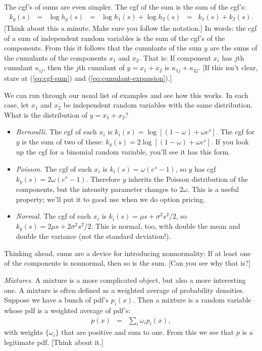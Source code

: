 \documentclass[11pt]{article}
\begin{document}
The cgf's of sums are even simpler.
The cgf of the sum is the sum of the cgf's:
\begin{eqnarray}
    k_y(s) &=& \log h_y(s)
            \;\;=\;\; \log h_1(s) + \log h_2(s)
            \;\;=\;\; k_1(s) + k_2(s) .
            \label{eq:cgf-sum}
\end{eqnarray}
[Think about this a minute.  Make sure you follow the notation.]
In words: the cgf of a sum of independent random variables
is the sum of the cgf's of the components.
From this it follows that the cumulants of the sum $y$
are the sums of the cumulants of the components $x_1$ and $x_2$.
That is:  If component $x_i$ has $j$th cumulant  $\kappa_{ij}$,
then the $j$th cumulant of $y = x_1 + x_2$ is $ \kappa_{1j} + \kappa_{2j}$.
[If this isn't clear, stare at (\ref{eq:cgf-sum}) and (\ref{eq:cumulant-expansion}).]


We can run through our usual list of examples and see how this works.
In each case, let $x_1$ and $x_2$ be independent random variables with the same distribution.
What is the distribution of $y=x_1 + x_2$?
%
\begin{itemize}
\item {\it Bernoulli.\/}
The cgf of each $x_i$ is
$    k_i(s) = \log \left[ (1-\omega) + \omega e^{s} \right] $.
The cgf for $y$ is the sum of two of these:
$    k_y(s) = 2 \log \left[ (1-\omega) + \omega e^{s} \right] $.
If you look up the cgf for a binomial random variable, you'll see it has this form.

\item {\it Poisson.\/}  The cgf of each $x_i$ is
$  k_i(s) = \omega (e^{s}-1)  $,
so $y$ has cgf
$  k_y(s) = 2\omega (e^{s}-1)  $.
Therefore $y$ inherits the Poisson distribution of the components,
but the intensity parameter changes to $2 \omega$.
This is a useful property; we'll put it to good use when we do option pricing.


\item {\it Normal.\/}
The cgf of each $x_i$ is
$    k_i(s) = \mu s + \sigma^2 s^2/2  $,
so $k_y(s) = 2\mu s + 2\sigma^2 s^2/2$.
This is normal, too, with double the mean and double the variance
(not the standard deviation!).
\end{itemize}

Thinking ahead, sums are a device for introducing nonnormality:
If at least one of the components is nonnormal,
then so is the sum.
[Can you see why that is?]

{\it Mixtures.\/}
A  mixture is a more complicated object,
but also a more interesting one.
A mixture is often defined as a weighted average of probability densities.
Suppose we have a bunch of pdf's $p_i(x)$.
Then a mixture is a random variable whose pdf is a weighted average of pdf's:
\begin{eqnarray*}
    p(x) &=& \sum_i \omega_i p_i(x) ,
\end{eqnarray*}
with weights $\{\omega_i\}$ that are positive and sum to one.
From this we see that $p$ is a legitimate pdf.
[Think about it.]
\end{document}
